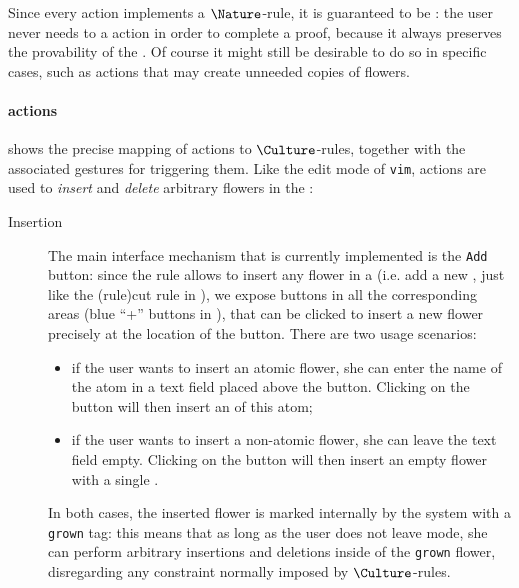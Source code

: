\begin{scope}
Since every  action implements a $\Nature$-rule, it is guaranteed to be
\emph{}: the user never needs to  a  action in order to
complete a proof, because it always preserves the provability of the . Of
course it might still be desirable to do so in specific cases, such as
 actions that may create unneeded copies of flowers.

\paragraph{ actions}

 shows the precise mapping of  actions to
$\Culture$-rules, together with the associated gestures for triggering them.
Like the edit mode of \texttt{vim},  actions are used to \emph{insert} and
\emph{delete} arbitrary flowers in the :
\begin{description}
  \item[Insertion] The main interface mechanism that is currently
  implemented is the \texttt{Add} button: since the  rule allows to
  insert any flower in a   (i.e. add a new , just like the
  \kl(rule){cut} rule in ), we expose buttons in all the corresponding
  areas (blue ``+'' buttons in ), that can be
  clicked to insert a new flower precisely at the location of the button. There
  are two usage scenarios:
  \begin{itemize}
    \item if the user wants to insert an atomic flower, she can enter the name
    of the atom in a text field placed above the button. Clicking on the button
    will then insert an  of this atom;
    \item if the user wants to insert a non-atomic flower, she can leave the
    text field empty. Clicking on the button will then insert an empty flower
    with a single .
  \end{itemize}
  In both cases, the inserted flower is marked internally by the system with a
  \texttt{grown} tag: this means that as long as the user does not leave
   mode, she can perform arbitrary insertions and deletions inside of
  the \texttt{grown} flower, disregarding any  constraint normally
  imposed by $\Culture$-rules.
  

\end{description}
\end{scope}
